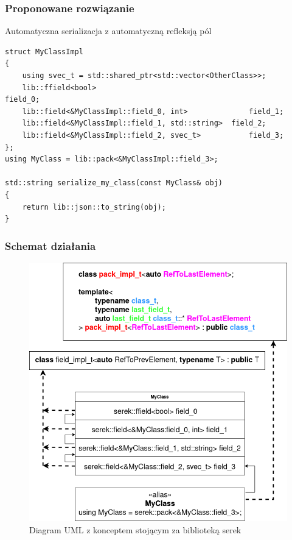 \documentclass[12pt]{beamer}
\begin{document}
	\begin{frame}[fragile]
		\frametitle{Proponowane rozwiązanie}

		Automatyczna serializacja z automatyczną refleksją pól\newline

		\begin{lstlisting}[frame=single]
struct MyClassImpl
{
	using svec_t = std::shared_ptr<std::vector<OtherClass>>;
	lib::ffield<bool>											field_0;
	lib::field<&MyClassImpl::field_0, int>				field_1;
	lib::field<&MyClassImpl::field_1, std::string> 	field_2;
	lib::field<&MyClassImpl::field_2, svec_t>			field_3;
};
using MyClass = lib::pack<&MyClassImpl::field_3>;

std::string serialize_my_class(const MyClass& obj)
{
	return lib::json::to_string(obj);
}
		\end{lstlisting}

	\end{frame}

	\begin{frame}
		\frametitle{Schemat działania}

		\begin{figure}[ht!]
			\centering
			\includegraphics[width=0.75\framewidth, keepaspectratio=true]{./basic_concept_of_serek_UML.png}
			\caption{Diagram UML z konceptem stojącym za biblioteką serek}
		\end{figure}

	\end{frame}
\end{document}
